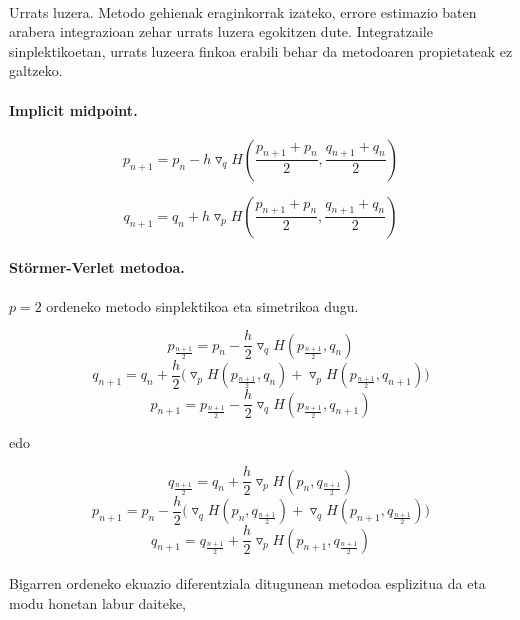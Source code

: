 \paragraph*{} Urrats luzera. Metodo gehienak eraginkorrak izateko, errore estimazio baten arabera integrazioan zehar urrats luzera egokitzen dute. Integratzaile sinplektikoetan, urrats luzeera finkoa erabili behar da metodoaren propietateak ez galtzeko.  

\paragraph{\textbf{Implicit midpoint}.}

\begin{equation*}
p_{n+1}=p_n-h \triangledown_q H(\frac{p_{n+1}+p_n}{2},\frac{q_{n+1}+q_n}{2})
\end{equation*}

\begin{equation*}
q_{n+1}=q_n+h \triangledown_p H(\frac{p_{n+1}+p_n}{2},\frac{q_{n+1}+q_n}{2})
\end{equation*}

\paragraph*{\textbf{Störmer-Verlet  metodoa}.}
$p=2$ ordeneko metodo sinplektikoa eta simetrikoa dugu.

\[p_{\frac{n+1}{2}}=p_n-\frac{h}{2} \triangledown_q H(p_{\frac{n+1}{2}},q_n) \]
\begin{equation}
q_{n+1}=q_n+\frac{h}{2} \big(\triangledown_p H(p_{\frac{n+1}{2}},q_n)+ \triangledown_p H(p_{\frac{n+1}{2}},q_{n+1}) \big)
\end{equation}
\[p_{n+1}=p_{\frac{n+1}{2}}-\frac{h}{2} \triangledown_q H(p_{\frac{n+1}{2}},q_{n+1}) \]

edo

\[q_{\frac{n+1}{2}}=q_n+\frac{h}{2} \triangledown_p H(p_n,q_{\frac{n+1}{2}}) \]
\begin{equation}
p_{n+1}=p_n-\frac{h}{2} \big(\triangledown_q H(p_n,q_{\frac{n+1}{2}})+ \triangledown_q H(p_{n+1},q_{\frac{n+1}{2}}) \big)
\end{equation}
\[q_{n+1}=q_{\frac{n+1}{2}}+\frac{h}{2} \triangledown_p H(p_{n+1},q_{\frac{n+1}{2}}) \]


\paragraph*{}Bigarren ordeneko ekuazio diferentziala ditugunean metodoa esplizitua da eta modu honetan labur daiteke,

